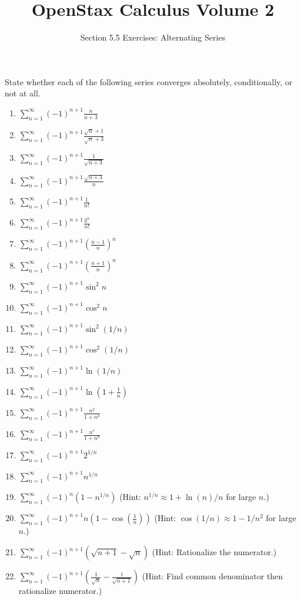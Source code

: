\documentclass{exercises}
\title{OpenStax Calculus Volume 2}
\subtitle{Section 5.5 Exercises: Alternating Series}
\author{}
\date{}
\begin{document}
\maketitle


State whether each of the following series converges absolutely, conditionally, or not at all.

\begin{enumerate}[start=1]
\item $\sum_{n=1}^{\infty}{(-1)}^{n+1}\frac{n}{n+3}$
\item $\sum_{n=1}^{\infty}{(-1)}^{n+1}\frac{\sqrt{n}+1}{\sqrt{n}+3}$
\item $\sum_{n=1}^{\infty}{(-1)}^{n+1}\frac{1}{\sqrt{n+3}}$
\item $\sum_{n=1}^{\infty}{(-1)}^{n+1}\frac{\sqrt{n+3}}{n}$
\item $\sum_{n=1}^{\infty}{(-1)}^{n+1}\frac{1}{n!}$
\item $\sum_{n=1}^{\infty}{(-1)}^{n+1}\frac{3^{n}}{n!}$
\item $\sum_{n=1}^{\infty}{(-1)}^{n+1}{(\frac{n-1}{n})}^{n}$
\item $\sum_{n=1}^{\infty}{(-1)}^{n+1}{(\frac{n+1}{n})}^{n}$
\item $\sum_{n=1}^{\infty}{(-1)}^{n+1}\sin^{2}n$
\item $\sum_{n=1}^{\infty}{(-1)}^{n+1}\cos^{2}n$
\item $\sum_{n=1}^{\infty}{(-1)}^{n+1}\sin^{2}(1/n)$
\item $\sum_{n=1}^{\infty}{(-1)}^{n+1}\cos^{2}(1/n)$
\item $\sum_{n=1}^{\infty}{(-1)}^{n+1}\ln(1/n)$
\item $\sum_{n=1}^{\infty}{(-1)}^{n+1}\ln(1+\frac{1}{n})$
\item $\sum_{n=1}^{\infty}{(-1)}^{n+1}\frac{n^{2}}{1+n^{4}}$
\item $\sum_{n=1}^{\infty}{(-1)}^{n+1}\frac{n^{e}}{1+n^{\pi}}$
\item $\sum_{n=1}^{\infty}{(-1)}^{n+1}2^{1/n}$
\item $\sum_{n=1}^{\infty}{(-1)}^{n+1}n^{1/n}$
\item $\sum_{n=1}^{\infty}{(-1)}^{n}(1-n^{1/n})$ (Hint: $n^{1/n}\approx1+\ln(n)/n$ for large $n$.)
\item $\sum_{n=1}^{\infty}{(-1)}^{n+1}n(1-\cos(\frac{1}{n}))$ (Hint: $\cos(1/n)\approx1-1/n^{2}$ for large $n$.)
\item $\sum_{n=1}^{\infty}{(-1)}^{n+1}(\sqrt{n+1}-\sqrt{n})$ (Hint: Rationalize the numerator.)
\item $\sum_{n=1}^{\infty}{(-1)}^{n+1}(\frac{1}{\sqrt{n}}-\frac{1}{\sqrt{n+1}})$ (Hint: Find common denominator then rationalize numerator.)

\end{enumerate}
\end{document}
